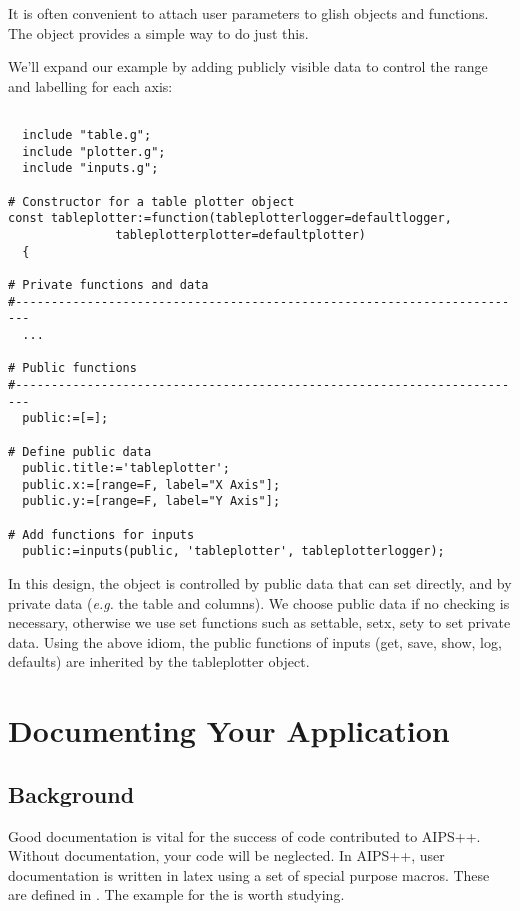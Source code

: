 It is often convenient to attach user parameters to glish
objects and functions. The  object 
provides a simple way to do just this. 

We'll expand our example by adding publicly visible data to
control the range and labelling for each axis:

\begin{verbatim}
  
  include "table.g";
  include "plotter.g";
  include "inputs.g";
  
# Constructor for a table plotter object
const tableplotter:=function(tableplotterlogger=defaultlogger,
		       tableplotterplotter=defaultplotter) 
  {
    
# Private functions and data
#------------------------------------------------------------------------
  ...

# Public functions
#------------------------------------------------------------------------
  public:=[=];

# Define public data
  public.title:='tableplotter';
  public.x:=[range=F, label="X Axis"];
  public.y:=[range=F, label="Y Axis"];
  
# Add functions for inputs
  public:=inputs(public, 'tableplotter', tableplotterlogger);
\end{verbatim}

In this design, the object is controlled by public data that can set
directly, and by private data ({\em e.g.} the table and columns).  We
choose public data if no checking is necessary, otherwise we use set
functions such as settable, setx, sety to set private data. Using the
above idiom, the public functions of inputs (get, save, show, log,
defaults) are inherited by the tableplotter object.



\section{Documenting Your Application}
\label{sec:documenting}
\subsection{Background}

Good documentation is vital for the success of code contributed to
AIPS++. Without documentation, your code will be neglected.  In
AIPS++, user documentation is written in latex using a set of special
purpose macros. These are defined in .
The example for the  is worth studying.

